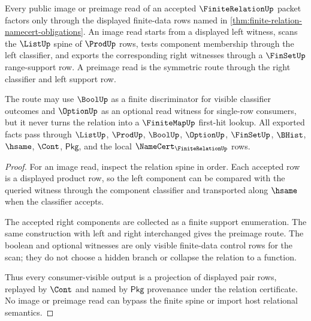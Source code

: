 \begin{theorem}
\label{thm:finite-relation-image-preimage-route}
Every public image or preimage read of an accepted $\FiniteRelationUp$ packet factors only through the displayed finite-data rows named in \autoref{thm:finite-relation-namecert-obligations}. An image read starts from a displayed left witness, scans the $\ListUp$ spine of $\ProdUp$ rows, tests component membership through the left classifier, and exports the corresponding right witnesses through a $\FinSetUp$ range-support row. A preimage read is the symmetric route through the right classifier and left support row.

The route may use $\BoolUp$ as a finite discriminator for visible classifier outcomes and $\OptionUp$ as an optional read witness for single-row consumers, but it never turns the relation into a $\FiniteMapUp$ first-hit lookup. All exported facts pass through $\ListUp$, $\ProdUp$, $\BoolUp$, $\OptionUp$, $\FinSetUp$, $\BHist$, $\hsame$, $\Cont$, $\mathsf{Pkg}$, and the local $\NameCert_{\FiniteRelationUp}$ rows.
\end{theorem}
\begin{proof}
For an image read, inspect the relation spine in order. Each accepted row is a displayed product row, so the left component can be compared with the queried witness through the component classifier and transported along $\hsame$ when the classifier accepts.

The accepted right components are collected as a finite support enumeration. The same construction with left and right interchanged gives the preimage route. The boolean and optional witnesses are only visible finite-data control rows for the scan; they do not choose a hidden branch or collapse the relation to a function.

Thus every consumer-visible output is a projection of displayed pair rows, replayed by $\Cont$ and named by $\mathsf{Pkg}$ provenance under the relation certificate. No image or preimage read can bypass the finite spine or import host relational semantics.
\end{proof}

\begin{closurestatus}{\FiniteRelationUp}
  \theoryclosure{\seedClosure}
  \formalstatus{\unformalizedV}
\end{closurestatus}
